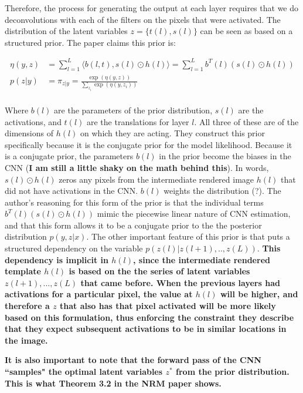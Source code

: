 \documentclass{report}
\begin{document}
	Therefore, the process for generating the output at each layer requires that we do deconvolutions with each of the filters on the pixels that were activated. The distribution of the latent variables $z = \{t(l), s(l)\}$ can be seen as based on a structured prior. The paper claims this prior is:
	
	\begin{equation}
		\begin{split}
		\eta(y, z) &= \sum_{l=1}^{L} \langle b(l, t), s(l) \odot h(l) \rangle = \sum_{l=1}^{L} b^T(l)(s(l) \odot h(l))\\
	 	p(z | y) &= \pi_{z|y} = \frac{\exp \left(\eta(y, z)\right)}
	 	{\sum_{z_i}\exp\left(\eta(y, z_i)\right)} \\
	 	\end{split}
	\end{equation}

	Where $b(l)$ are the parameters of the prior distribution, $s(l)$ are the activations, and $t(l)$ are the translations for layer $l$. All three of these are of the dimensions of $h(l)$ on which they are acting. They construct this prior specifically because it is the conjugate prior for the model likelihood. Because it is a conjugate prior, the parameters $b(l)$ in the prior become the biases in the CNN (\textbf{I am still a little shaky on the math behind this}). 
	In words, $s(l) \odot h(l)$ zeros any pixels from the intermediate rendered image $h(l)$ that did not have activations in the CNN. $b(l)$ weights the distribution (?).  The author's reasoning for this form of the prior is that the individual terms $b^T(l)(s(l)\odot h(l))$ mimic the piecewise linear nature of CNN estimation, and that this form allows it to be a conjugate prior to the the posterior distribution $p(y, z | x)$. The other important feature of this prior is that puts a structured dependency on the variable $p(z(l) | z(l + 1), .., z(L))$. \textbf{This dependency is implicit in $h(l)$, since the intermediate rendered template $h(l)$ is based on the the series of latent variables $z(l + 1), ..., z(L)$ that came before. When the previous layers had activations for a particular pixel, the value at $h(l)$ will be higher, and therefore a $z$ that also has that pixel activated will be more likely based on this formulation, thus enforcing the constraint they describe that they expect subsequent activations to be in similar locations in the image.} 
	
	\textbf{It is also important to note that the forward pass of the CNN ``samples" the optimal latent variables $z^*$ from the prior distribution. This is what Theorem 3.2 in the NRM paper shows.}
	
\end{document}
